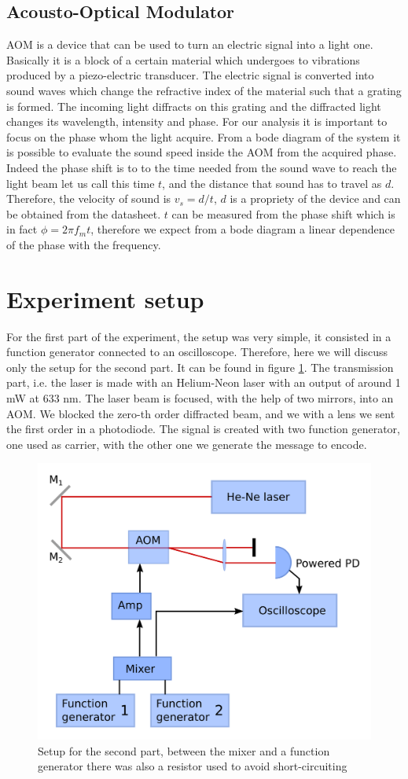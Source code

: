 \documentclass[a4paper,10pt]{article}
\begin{document}
\subsection{Acousto-Optical Modulator}
AOM is a device that can be used to turn an electric signal into a light one. Basically it is a block of a certain material which undergoes to vibrations produced by a piezo-electric transducer. The electric signal is converted into sound waves which change the refractive index of the material such that a grating is formed. The incoming light diffracts on this grating and the diffracted light changes its wavelength, intensity and phase. For our analysis it is important to focus on the phase whom the light acquire. From a bode diagram of the system it is possible to evaluate the sound speed inside the AOM from the acquired phase. Indeed the phase shift is to to the time needed from the sound wave to reach the light beam let us call this time $t$, and the distance that sound has to travel as $d$. Therefore, the velocity of sound is $v_s = d/t$, $d$ is a propriety of the device and can be obtained from the datasheet. $t$ can be measured from the phase shift which is in fact $\phi = 2\pi f_m t$, therefore we expect from a bode diagram a linear dependence of the phase with the frequency.
\section{Experiment setup}
For the first part of the experiment, the setup was very simple, it consisted in a function generator connected to an oscilloscope. Therefore, here we will discuss only the setup for the second part. It can be found in figure \ref{setup}. The transmission part, i.e. the laser is made with an Helium-Neon laser with an output of around 1 mW at 633 nm. The laser beam is focused, with the help of two mirrors, into an AOM. We blocked the zero-th order diffracted beam, and we with a lens we sent the first order in a photodiode. The signal is created with two function generator, one used as carrier, with the other one we generate the message to encode.
\begin{figure}[H]
\centering
\includegraphics[width=.8\textwidth]{setup}
\caption{Setup for the second part, between the mixer and a function generator there was also a resistor used to avoid short-circuiting}\label{setup}
\end{figure}
\end{document}

